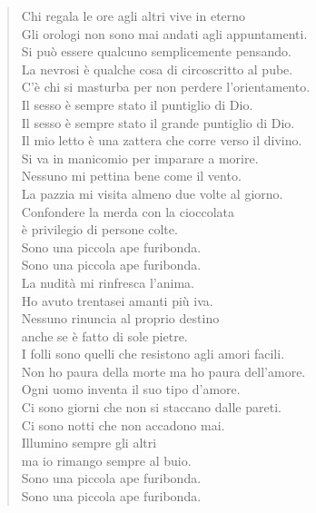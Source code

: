 \begin{verse}
\centering
Chi regala le ore agli altri vive in eterno \\
Gli orologi non sono mai andati agli appuntamenti. \\
Si può essere qualcuno semplicemente pensando. \\
La nevrosi è qualche cosa di circoscritto al pube. \\
C’è chi si masturba per non perdere l’orientamento. \\
Il sesso è sempre stato il puntiglio di Dio. \\
Il sesso è sempre stato il grande puntiglio di Dio. \\
Il mio letto è una zattera che corre verso il divino. \\
Si va in manicomio per imparare a morire. \\
Nessuno mi pettina bene come il vento. \\
La pazzia mi visita almeno due volte al giorno. \\
Confondere la merda con la cioccolata \\
è privilegio di persone colte. \\
Sono una piccola ape furibonda. \\
Sono una piccola ape furibonda. \\

La nudità mi rinfresca l’anima. \\
Ho avuto trentasei amanti più iva. \\
Nessuno rinuncia al proprio destino \\
anche se è fatto di sole pietre. \\
I folli sono quelli che resistono agli amori facili. \\
Non ho paura della morte ma ho paura dell’amore. \\
Ogni uomo inventa il suo tipo d’amore. \\
Ci sono giorni che non si staccano dalle pareti. \\
Ci sono notti che non accadono mai. \\
Illumino sempre gli altri \\
ma io rimango sempre al buio. \\
Sono una piccola ape furibonda. \\
Sono una piccola ape furibonda.
\end{verse}
